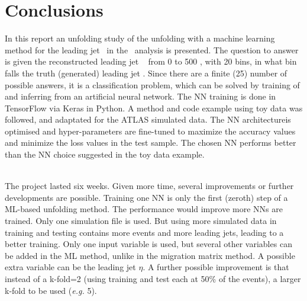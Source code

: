\section{Conclusions}
\label{sec:Conclusions}

In this report an unfolding study of the unfolding with a machine learning method for the leading jet \pt~in the \ttbaremu~analysis is presented. The question to answer is given the reconstructed leading jet \pt~ from 0 to 500 \GeV, with 20 \GeV bins, in what bin falls the truth (generated) leading jet \pt. Since there are a finite (25) number of possible answers, it is a classification problem, which can be solved by training of and inferring from an artificial neural network. The NN training is done in TensorFlow via Keras in Python. A method and code example using toy data was followed, and adaptated for the ATLAS simulated data. The NN architectureis optimised  and hyper-parameters are fine-tuned to maximize the accuracy values and minimize the loss values in the test sample. The chosen NN performs better than the NN choice suggested in the toy data example. 

\ \\The project lasted six weeks. Given more time, several improvements or further developments are possible. Training one NN is only the first (zeroth) step of a ML-based unfolding method. The performance would improve more NNs are trained. Only one simulation file is used. But using more simulated data in training and testing contains more events and more leading jets, leading to a better training. Only one input variable is used, but several other variables can be added in the ML method, unlike in the migration matrix method. A possible extra variable can be the leading jet $\eta$. A further possible improvement is that instead of a k-fold=2 (using training and test each at 50\% of the events), a larger k-fold to be used (\emph {e.g.} 5). 
